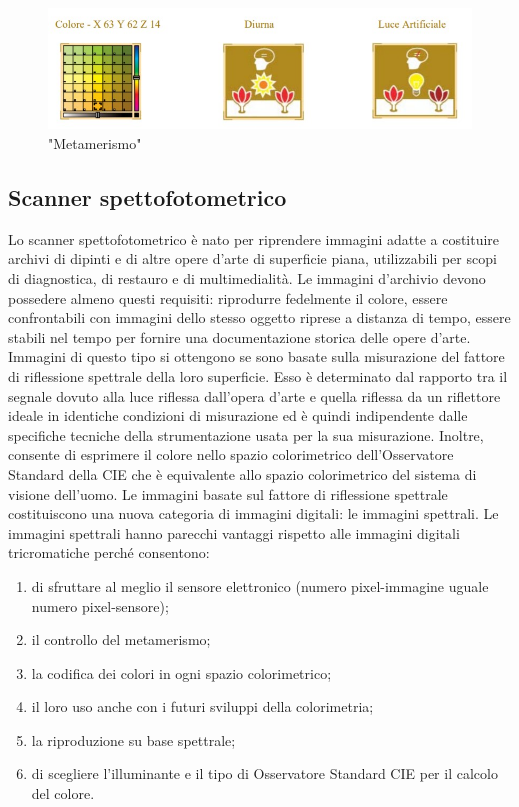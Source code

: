 \documentclass[a4paper,11pt]{article}
\begin{document}
        \begin{figure}[h]
        \centering
        \includegraphics[scale=0.8]{colorimetria2}
        \caption{"Metamerismo"}
        \end{figure}
       
        \subsection{Scanner spettofotometrico}
        Lo scanner spettofotometrico è nato per riprendere immagini adatte a
        costituire archivi di dipinti e di altre opere d’arte di superficie piana, utilizzabili per scopi di diagnostica, di
        restauro e di multimedialità. Le immagini d’archivio devono possedere almeno questi requisiti: riprodurre
        fedelmente il colore, essere confrontabili con immagini dello stesso oggetto riprese a distanza di tempo,
        essere stabili nel tempo per fornire una documentazione storica delle opere d’arte. Immagini di questo tipo si
        ottengono se sono basate sulla misurazione del fattore di riflessione spettrale della loro superficie. Esso è
        determinato dal rapporto tra il segnale dovuto alla luce riflessa dall’opera d’arte e quella riflessa da un
        riflettore ideale in identiche condizioni di misurazione ed è quindi indipendente dalle specifiche tecniche
        della strumentazione usata per la sua misurazione. Inoltre, consente di esprimere il colore nello spazio
        colorimetrico dell’Osservatore Standard della CIE che è equivalente allo spazio colorimetrico del sistema di
        visione dell’uomo. Le immagini basate sul fattore di riflessione spettrale costituiscono una nuova categoria di
        immagini digitali: le immagini spettrali.
        Le immagini spettrali hanno parecchi vantaggi rispetto alle immagini digitali tricromatiche perché consentono:
        \begin{enumerate} 
             \item di sfruttare al meglio il sensore elettronico (numero pixel-immagine uguale numero pixel-sensore);
             \item il controllo del metamerismo;
             \item la codifica dei colori in ogni spazio colorimetrico;
             \item il loro uso anche con i futuri sviluppi della colorimetria;
             \item la riproduzione su base spettrale;
             \item di scegliere l’illuminante e il tipo di Osservatore Standard CIE per il calcolo del colore.
        \end{enumerate}
\end{document}
